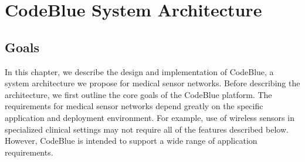 \chapter{CodeBlue System Architecture}
\label{chap-codeblue}




\label{sec-cb-arch}


\section{Goals}
\label{sec-cb-goals}


In this chapter, we describe the design and implementation of CodeBlue, a
system architecture we propose for medical sensor networks.
Before describing the architecture, we first outline the core goals of
the CodeBlue platform. The requirements for medical sensor networks 
depend greatly on the specific application and deployment environment. 
For example, use of wireless sensors in specialized clinical settings
may not require all of the features described below. However, CodeBlue is
intended
to support a wide range of application requirements.



